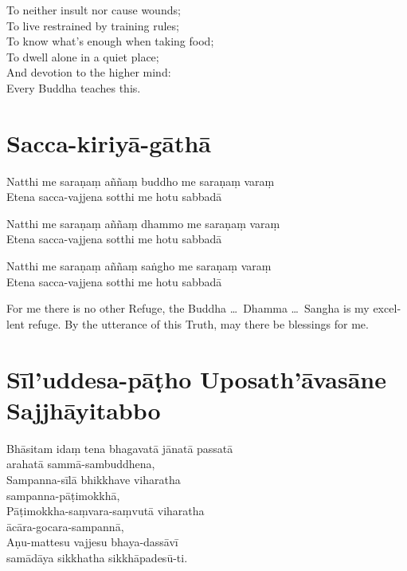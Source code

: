 To neither insult nor cause wounds;\\
To live restrained by training rules;\\
To know what's enough when taking food;\\
To dwell alone in a quiet place;\\
And devotion to the higher mind:\\
Every Buddha teaches this.

\section{Sacca-kiriyā-gāthā}

\begin{leader}
\end{leader}


Natthi me saraṇaṃ aññaṃ buddho me saraṇaṃ varaṃ\\
Etena sacca-vajjena sotthi me hotu sabbadā

Natthi me saraṇaṃ aññaṃ dhammo me saraṇaṃ varaṃ\\
Etena sacca-vajjena sotthi me hotu sabbadā

Natthi me saraṇaṃ aññaṃ saṅgho me saraṇaṃ varaṃ\\
Etena sacca-vajjena sotthi me hotu sabbadā


\begin{english}
  For me there is no other Refuge, the Buddha \ldots\ Dhamma \ldots\ Sangha is
  my excellent refuge. By the utterance of this Truth, may there be blessings
  for me.
\end{english}

\section[Sīl'uddesa-pāṭho]{Sīl'uddesa-pāṭho Uposath'āvasāne Sajjhāyitabbo}

\begin{leader}
\end{leader}


Bhāsitam idaṃ tena bhagavatā jānatā passatā\\
arahatā sammā-sambuddhena,\\
Sampanna-sīlā bhikkhave viharatha\\
sampanna-pāṭimokkhā,\\
Pāṭimokkha-saṃvara-saṃvutā viharatha\\
ācāra-gocara-sampannā,\\
Aṇu-mattesu vajjesu bhaya-dassāvī\\
samādāya sikkhatha sikkhāpadesū-ti.

